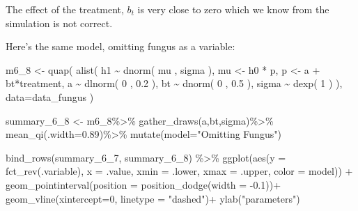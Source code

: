 \documentclass[
]{book}
\newenvironment{Shaded}{\begin{snugshade}}{\end{snugshade}}
\newcommand{\AttributeTok}[1]{\textcolor[rgb]{0.77,0.63,0.00}{#1}}
\newcommand{\DecValTok}[1]{\textcolor[rgb]{0.00,0.00,0.81}{#1}}
\newcommand{\FloatTok}[1]{\textcolor[rgb]{0.00,0.00,0.81}{#1}}
\newcommand{\FunctionTok}[1]{\textcolor[rgb]{0.00,0.00,0.00}{#1}}
\newcommand{\NormalTok}[1]{#1}
\newcommand{\OtherTok}[1]{\textcolor[rgb]{0.56,0.35,0.01}{#1}}
\newcommand{\SpecialCharTok}[1]{\textcolor[rgb]{0.00,0.00,0.00}{#1}}
\newcommand{\StringTok}[1]{\textcolor[rgb]{0.31,0.60,0.02}{#1}}
\begin{document}
The effect of the treatment, \(b_t\) is very close to zero which we know from the simulation is not correct.

Here's the same model, omitting fungus as a variable:

\begin{Shaded}
\begin{Highlighting}[]
\NormalTok{m6\_8 }\OtherTok{\textless{}{-}} \FunctionTok{quap}\NormalTok{( }\FunctionTok{alist}\NormalTok{( }
\NormalTok{  h1 }\SpecialCharTok{\textasciitilde{}} \FunctionTok{dnorm}\NormalTok{( mu , sigma ), }
\NormalTok{  mu }\OtherTok{\textless{}{-}}\NormalTok{ h0 }\SpecialCharTok{*}\NormalTok{ p, }
\NormalTok{  p }\OtherTok{\textless{}{-}}\NormalTok{ a }\SpecialCharTok{+}\NormalTok{ bt}\SpecialCharTok{*}\NormalTok{treatment, }
\NormalTok{  a }\SpecialCharTok{\textasciitilde{}} \FunctionTok{dlnorm}\NormalTok{( }\DecValTok{0}\NormalTok{ , }\FloatTok{0.2}\NormalTok{ ), }
\NormalTok{  bt }\SpecialCharTok{\textasciitilde{}} \FunctionTok{dnorm}\NormalTok{( }\DecValTok{0}\NormalTok{ , }\FloatTok{0.5}\NormalTok{ ), }
\NormalTok{  sigma }\SpecialCharTok{\textasciitilde{}} \FunctionTok{dexp}\NormalTok{( }\DecValTok{1}\NormalTok{ )}
\NormalTok{), }\AttributeTok{data=}\NormalTok{data\_fungus )}

\NormalTok{summary\_6\_8 }\OtherTok{\textless{}{-}}\NormalTok{ m6\_8}\SpecialCharTok{\%\textgreater{}\%}
  \FunctionTok{gather\_draws}\NormalTok{(a,bt,sigma)}\SpecialCharTok{\%\textgreater{}\%}
  \FunctionTok{mean\_qi}\NormalTok{(}\AttributeTok{.width=}\FloatTok{0.89}\NormalTok{)}\SpecialCharTok{\%\textgreater{}\%}
  \FunctionTok{mutate}\NormalTok{(}\AttributeTok{model=}\StringTok{"Omitting Fungus"}\NormalTok{)}


\FunctionTok{bind\_rows}\NormalTok{(summary\_6\_7, summary\_6\_8) }\SpecialCharTok{\%\textgreater{}\%}
  \FunctionTok{ggplot}\NormalTok{(}\FunctionTok{aes}\NormalTok{(}\AttributeTok{y =} \FunctionTok{fct\_rev}\NormalTok{(.variable), }\AttributeTok{x =}\NormalTok{ .value, }\AttributeTok{xmin =}\NormalTok{ .lower, }\AttributeTok{xmax =}\NormalTok{ .upper, }\AttributeTok{color =}\NormalTok{ model)) }\SpecialCharTok{+}
  \FunctionTok{geom\_pointinterval}\NormalTok{(}\AttributeTok{position =} \FunctionTok{position\_dodge}\NormalTok{(}\AttributeTok{width =} \SpecialCharTok{{-}}\FloatTok{0.1}\NormalTok{))}\SpecialCharTok{+}
  \FunctionTok{geom\_vline}\NormalTok{(}\AttributeTok{xintercept=}\DecValTok{0}\NormalTok{, }\AttributeTok{linetype =} \StringTok{"dashed"}\NormalTok{)}\SpecialCharTok{+}
  \FunctionTok{ylab}\NormalTok{(}\StringTok{"parameters"}\NormalTok{)}
\end{Highlighting}
\end{Shaded}
\end{document}
